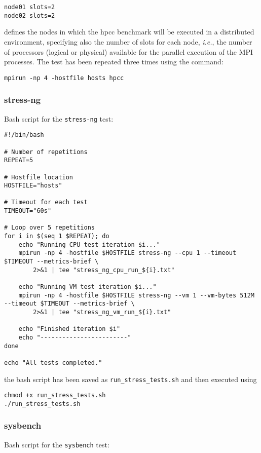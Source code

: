 \begin{verbatim}
node01 slots=2
node02 slots=2
\end{verbatim}

 defines the nodes in which the hpcc benchmark will be executed in a distributed environment, specifying also the number of slots for each node, \textit{i.e.}, the number of processors (logical or physical) available for the parallel execution of the MPI processes. The test has been repeated three times using the command:
 
\begin{verbatim}
mpirun -np 4 -hostfile hosts hpcc
\end{verbatim}

\subsubsection{stress-ng}
Bash script for the \texttt{stress-ng} test:

\begin{verbatim}
#!/bin/bash

# Number of repetitions
REPEAT=5

# Hostfile location
HOSTFILE="hosts"

# Timeout for each test
TIMEOUT="60s"

# Loop over 5 repetitions
for i in $(seq 1 $REPEAT); do
    echo "Running CPU test iteration $i..."
    mpirun -np 4 -hostfile $HOSTFILE stress-ng --cpu 1 --timeout $TIMEOUT --metrics-brief \
        2>&1 | tee "stress_ng_cpu_run_${i}.txt"

    echo "Running VM test iteration $i..."
    mpirun -np 4 -hostfile $HOSTFILE stress-ng --vm 1 --vm-bytes 512M --timeout $TIMEOUT --metrics-brief \
        2>&1 | tee "stress_ng_vm_run_${i}.txt"
    
    echo "Finished iteration $i"
    echo "------------------------"
done

echo "All tests completed."
\end{verbatim}

the bash script has been saved as \texttt{run\_stress\_tests.sh} and then executed using

\begin{verbatim}
chmod +x run_stress_tests.sh
./run_stress_tests.sh
\end{verbatim}

\subsubsection{sysbench}
Bash script for the \texttt{sysbench} test:

